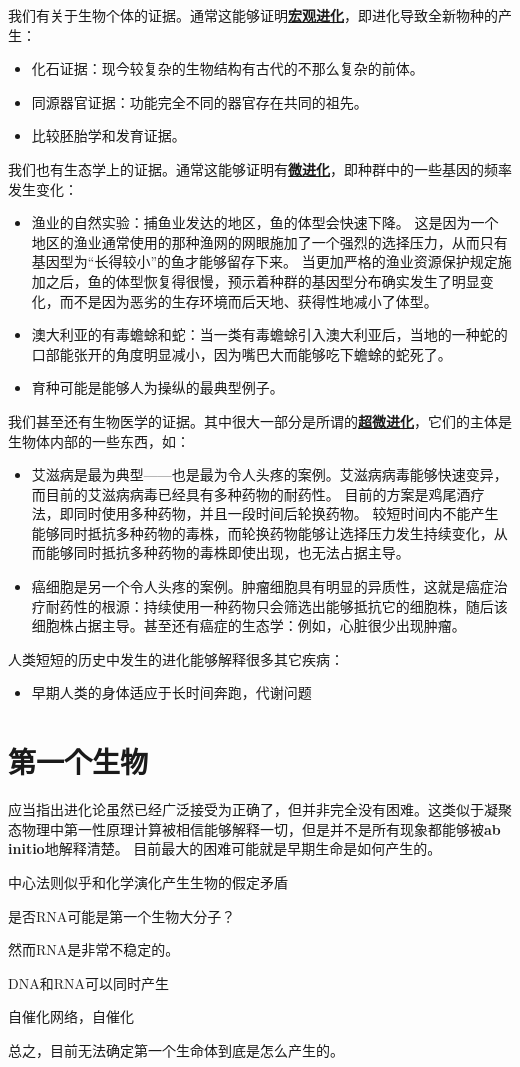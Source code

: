 \documentclass[hyperref, UTF8, a4paper, oneside]{ctexart}
\renewcommand{\emph}[1]{\textbf{#1}}
\newcommand*{\concept}[1]{\underline{\textbf{#1}}}
\numberwithin{equation}{section}
\begin{document}
我们有关于生物个体的证据。通常这能够证明\concept{宏观进化}，即进化导致全新物种的产生：
\begin{itemize}
  \item 化石证据：现今较复杂的生物结构有古代的不那么复杂的前体。
  \item 同源器官证据：功能完全不同的器官存在共同的祖先。
  \item 比较胚胎学和发育证据。
\end{itemize}

我们也有生态学上的证据。通常这能够证明有\concept{微进化}，即种群中的一些基因的频率发生变化：
\begin{itemize}
  \item 渔业的自然实验：捕鱼业发达的地区，鱼的体型会快速下降。
  这是因为一个地区的渔业通常使用的那种渔网的网眼施加了一个强烈的选择压力，从而只有基因型为“长得较小”的鱼才能够留存下来。
  当更加严格的渔业资源保护规定施加之后，鱼的体型恢复得很慢，预示着种群的基因型分布确实发生了明显变化，而不是因为恶劣的生存环境而后天地、获得性地减小了体型。
  \item 澳大利亚的有毒蟾蜍和蛇：当一类有毒蟾蜍引入澳大利亚后，当地的一种蛇的口部能张开的角度明显减小，因为嘴巴大而能够吃下蟾蜍的蛇死了。
  \item 育种可能是能够人为操纵的最典型例子。
\end{itemize}

我们甚至还有生物医学的证据。其中很大一部分是所谓的\concept{超微进化}，它们的主体是生物体内部的一些东西，如：
\begin{itemize}
  \item 艾滋病是最为典型——也是最为令人头疼的案例。艾滋病病毒能够快速变异，而目前的艾滋病病毒已经具有多种药物的耐药性。
  目前的方案是鸡尾酒疗法，即同时使用多种药物，并且一段时间后轮换药物。
  较短时间内不能产生能够同时抵抗多种药物的毒株，而轮换药物能够让选择压力发生持续变化，从而能够同时抵抗多种药物的毒株即使出现，也无法占据主导。
  \item 癌细胞是另一个令人头疼的案例。肿瘤细胞具有明显的异质性，这就是癌症治疗耐药性的根源：持续使用一种药物只会筛选出能够抵抗它的细胞株，随后该细胞株占据主导。甚至还有癌症的生态学：例如，心脏很少出现肿瘤。
\end{itemize}
人类短短的历史中发生的进化能够解释很多其它疾病：
\begin{itemize}
  \item 早期人类的身体适应于长时间奔跑，代谢问题
\end{itemize}

\section{第一个生物}

应当指出进化论虽然已经广泛接受为正确了，但并非完全没有困难。这类似于凝聚态物理中第一性原理计算被相信能够解释一切，但是并不是所有现象都能够被\emph{ab initio}地解释清楚。
目前最大的困难可能就是早期生命是如何产生的。

中心法则似乎和化学演化产生生物的假定矛盾

是否RNA可能是第一个生物大分子？

然而RNA是非常不稳定的。

DNA和RNA可以同时产生

自催化网络，自催化

总之，目前无法确定第一个生命体到底是怎么产生的。
\end{document}
